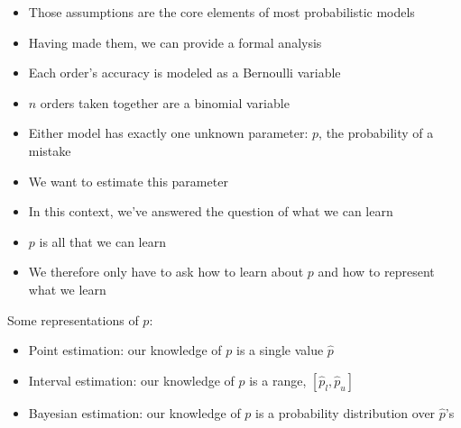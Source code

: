 \documentclass{beamer}
\begin{document}
\frame
{
  \begin{itemize}
    \item{Those assumptions are the core elements of most probabilistic models}
    \item{Having made them, we can provide a formal analysis}
  \end{itemize}
}

\frame
{
  \begin{itemize}
    \item{Each order's accuracy is modeled as a Bernoulli variable}
    \item{$n$ orders taken together are a binomial variable}
    \item{Either model has exactly one unknown parameter: $p$, the probability of a mistake}
    \item{We want to estimate this parameter}
  \end{itemize}
}

\frame
{
 \begin{itemize}
   \item{In this context, we've answered the question of what we can learn}
   \item{$p$ is all that we can learn}
   \item{We therefore only have to ask how to learn about $p$ and how to represent what we learn}
 \end{itemize}
}

\frame
{
 Some representations of $p$:
 \begin{itemize}
   \item{Point estimation: our knowledge of $p$ is a single value $\hat{p}$}
   \item{Interval estimation: our knowledge of $p$ is a range, $[\hat{p}_{l}, \hat{p}_{u}]$}
   \item{Bayesian estimation: our knowledge of $p$ is a probability distribution over $\hat{p}$'s}
 \end{itemize}
}
\end{document}
